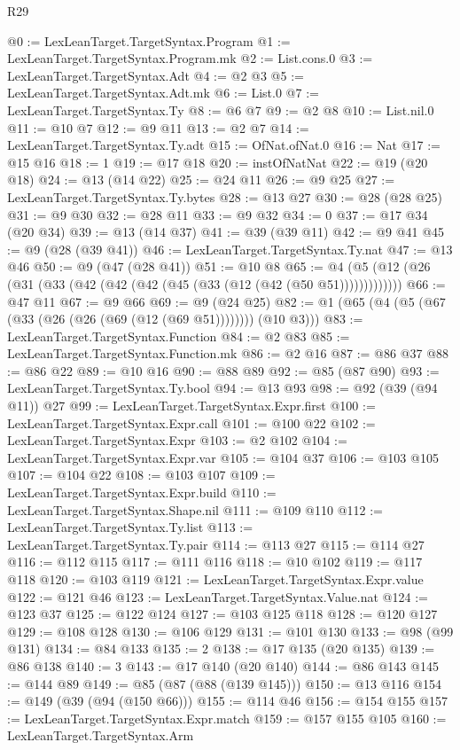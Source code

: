 \begin{lexlean}{R29}
\begin{coremodule}
@0 := LexLeanTarget.TargetSyntax.Program
@1 := LexLeanTarget.TargetSyntax.Program.mk
@2 := List.cons.{0}
@3 := LexLeanTarget.TargetSyntax.Adt
@4 := @2 @3
@5 := LexLeanTarget.TargetSyntax.Adt.mk
@6 := List.{0}
@7 := LexLeanTarget.TargetSyntax.Ty
@8 := @6 @7
@9 := @2 @8
@10 := List.nil.{0}
@11 := @10 @7
@12 := @9 @11
@13 := @2 @7
@14 := LexLeanTarget.TargetSyntax.Ty.adt
@15 := OfNat.ofNat.{0}
@16 := Nat
@17 := @15 @16
@18 := 1
@19 := @17 @18
@20 := instOfNatNat
@22 := @19 (@20 @18)
@24 := @13 (@14 @22)
@25 := @24 @11
@26 := @9 @25
@27 := LexLeanTarget.TargetSyntax.Ty.bytes
@28 := @13 @27
@30 := @28 (@28 @25)
@31 := @9 @30
@32 := @28 @11
@33 := @9 @32
@34 := 0
@37 := @17 @34 (@20 @34)
@39 := @13 (@14 @37)
@41 := @39 (@39 @11)
@42 := @9 @41
@45 := @9 (@28 (@39 @41))
@46 := LexLeanTarget.TargetSyntax.Ty.nat
@47 := @13 @46
@50 := @9 (@47 (@28 @41))
@51 := @10 @8
@65 := @4 (@5 (@12 (@26 (@31 (@33 (@42 (@42 (@42 (@45 (@33 (@12 (@42 (@50 @51)))))))))))))
@66 := @47 @11
@67 := @9 @66
@69 := @9 (@24 @25)
@82 := @1 (@65 (@4 (@5 (@67 (@33 (@26 (@26 (@69 (@12 (@69 @51)))))))) (@10 @3)))
@83 := LexLeanTarget.TargetSyntax.Function
@84 := @2 @83
@85 := LexLeanTarget.TargetSyntax.Function.mk
@86 := @2 @16
@87 := @86 @37
@88 := @86 @22
@89 := @10 @16
@90 := @88 @89
@92 := @85 (@87 @90)
@93 := LexLeanTarget.TargetSyntax.Ty.bool
@94 := @13 @93
@98 := @92 (@39 (@94 @11)) @27
@99 := LexLeanTarget.TargetSyntax.Expr.first
@100 := LexLeanTarget.TargetSyntax.Expr.call
@101 := @100 @22
@102 := LexLeanTarget.TargetSyntax.Expr
@103 := @2 @102
@104 := LexLeanTarget.TargetSyntax.Expr.var
@105 := @104 @37
@106 := @103 @105
@107 := @104 @22
@108 := @103 @107
@109 := LexLeanTarget.TargetSyntax.Expr.build
@110 := LexLeanTarget.TargetSyntax.Shape.nil
@111 := @109 @110
@112 := LexLeanTarget.TargetSyntax.Ty.list
@113 := LexLeanTarget.TargetSyntax.Ty.pair
@114 := @113 @27
@115 := @114 @27
@116 := @112 @115
@117 := @111 @116
@118 := @10 @102
@119 := @117 @118
@120 := @103 @119
@121 := LexLeanTarget.TargetSyntax.Expr.value
@122 := @121 @46
@123 := LexLeanTarget.TargetSyntax.Value.nat
@124 := @123 @37
@125 := @122 @124
@127 := @103 @125 @118
@128 := @120 @127
@129 := @108 @128
@130 := @106 @129
@131 := @101 @130
@133 := @98 (@99 @131)
@134 := @84 @133
@135 := 2
@138 := @17 @135 (@20 @135)
@139 := @86 @138
@140 := 3
@143 := @17 @140 (@20 @140)
@144 := @86 @143
@145 := @144 @89
@149 := @85 (@87 (@88 (@139 @145)))
@150 := @13 @116
@154 := @149 (@39 (@94 (@150 @66)))
@155 := @114 @46
@156 := @154 @155
@157 := LexLeanTarget.TargetSyntax.Expr.match
@159 := @157 @155 @105
@160 := LexLeanTarget.TargetSyntax.Arm

\end{coremodule}
\end{lexlean}
